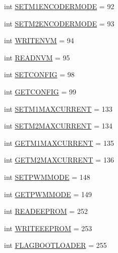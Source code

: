 \begin{DoxyCompactItemize}
\item 
int \mbox{\hyperlink{classtoxic__hardware_1_1roboclaw__3_1_1Roboclaw_1_1Cmd_a06fd231779d004fdb3987d69e8147a08}{S\+E\+T\+M1\+E\+N\+C\+O\+D\+E\+R\+M\+O\+DE}} = 92
\item 
int \mbox{\hyperlink{classtoxic__hardware_1_1roboclaw__3_1_1Roboclaw_1_1Cmd_a5bf4d6a39c0a827fc4bb0063e1abb1dc}{S\+E\+T\+M2\+E\+N\+C\+O\+D\+E\+R\+M\+O\+DE}} = 93
\item 
int \mbox{\hyperlink{classtoxic__hardware_1_1roboclaw__3_1_1Roboclaw_1_1Cmd_a066d106aab25d1154ee3d8ce1f13b810}{W\+R\+I\+T\+E\+N\+VM}} = 94
\item 
int \mbox{\hyperlink{classtoxic__hardware_1_1roboclaw__3_1_1Roboclaw_1_1Cmd_af401626d5962109d1165e5f3b352f79d}{R\+E\+A\+D\+N\+VM}} = 95
\item 
int \mbox{\hyperlink{classtoxic__hardware_1_1roboclaw__3_1_1Roboclaw_1_1Cmd_a2b1c9f9888927348fafe4a18b8946018}{S\+E\+T\+C\+O\+N\+F\+IG}} = 98
\item 
int \mbox{\hyperlink{classtoxic__hardware_1_1roboclaw__3_1_1Roboclaw_1_1Cmd_a088f90733ce706daaab417f9e5e59ff8}{G\+E\+T\+C\+O\+N\+F\+IG}} = 99
\item 
int \mbox{\hyperlink{classtoxic__hardware_1_1roboclaw__3_1_1Roboclaw_1_1Cmd_a07b08af329f4d291fcc5d9f40cd4bd1f}{S\+E\+T\+M1\+M\+A\+X\+C\+U\+R\+R\+E\+NT}} = 133
\item 
int \mbox{\hyperlink{classtoxic__hardware_1_1roboclaw__3_1_1Roboclaw_1_1Cmd_a1283c68f9019a59b0058bbec03fc008c}{S\+E\+T\+M2\+M\+A\+X\+C\+U\+R\+R\+E\+NT}} = 134
\item 
int \mbox{\hyperlink{classtoxic__hardware_1_1roboclaw__3_1_1Roboclaw_1_1Cmd_a031b148ac704691da05afe659ffcf175}{G\+E\+T\+M1\+M\+A\+X\+C\+U\+R\+R\+E\+NT}} = 135
\item 
int \mbox{\hyperlink{classtoxic__hardware_1_1roboclaw__3_1_1Roboclaw_1_1Cmd_a86be758f9ca74212cad0adcc08c720c9}{G\+E\+T\+M2\+M\+A\+X\+C\+U\+R\+R\+E\+NT}} = 136
\item 
int \mbox{\hyperlink{classtoxic__hardware_1_1roboclaw__3_1_1Roboclaw_1_1Cmd_a8a73a4398ee35a68b37e221f4ec974a9}{S\+E\+T\+P\+W\+M\+M\+O\+DE}} = 148
\item 
int \mbox{\hyperlink{classtoxic__hardware_1_1roboclaw__3_1_1Roboclaw_1_1Cmd_af4d5eb77d0a8dd96659b0cf531bc950b}{G\+E\+T\+P\+W\+M\+M\+O\+DE}} = 149
\item 
int \mbox{\hyperlink{classtoxic__hardware_1_1roboclaw__3_1_1Roboclaw_1_1Cmd_a83c3f5cb754e6e3aebeca177d015106f}{R\+E\+A\+D\+E\+E\+P\+R\+OM}} = 252
\item 
int \mbox{\hyperlink{classtoxic__hardware_1_1roboclaw__3_1_1Roboclaw_1_1Cmd_a4dcca8d3f4003c17ffb5c82a7c1ef63f}{W\+R\+I\+T\+E\+E\+E\+P\+R\+OM}} = 253
\item 
int \mbox{\hyperlink{classtoxic__hardware_1_1roboclaw__3_1_1Roboclaw_1_1Cmd_aab75358b95fc658690c3b2b018a0d22b}{F\+L\+A\+G\+B\+O\+O\+T\+L\+O\+A\+D\+ER}} = 255
\end{DoxyCompactItemize}


